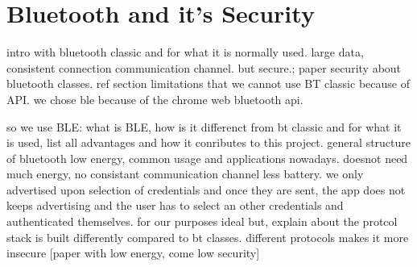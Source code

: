 \section{Bluetooth and it's Security}
\label{bluetooth}

intro with bluetooth classic and for what it is normally used. large data, consistent connection communication channel. but secure.; paper security about bluetooth classes.
ref section limitations that we cannot use BT classic because of API. we chose ble because of the chrome web bluetooth api.

so we use BLE: what is BLE, how is it differenct from bt classic and for what it is used, list all advantages and how it conributes to this project. general structure of bluetooth low energy, common usage and applications nowadays.
doesnot need much energy, no consistant communication channel less battery. we only advertised upon selection of credentials and once they are sent, the app does not keeps advertising and the user has to select an other credentials and authenticated themselves.
for our purposes ideal but, explain about the protcol stack is built differently compared to bt classes. different protocols makes it more insecure [paper with low energy, come low security]
